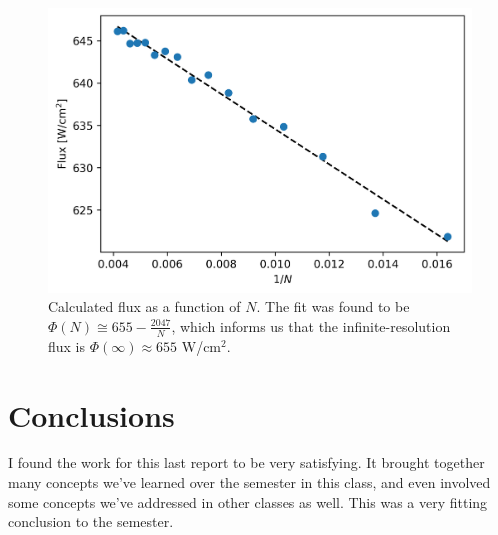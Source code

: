 \documentclass{article}
\begin{document}
\bigskip
{}
\medskip

\begin{figure}[H]
    \centering
    \includegraphics[width=4.5in]{homework10/4.png}
    \caption{Calculated flux as a function of $N$. The fit was found to be $\displaystyle \Phi(N)\cong655-\frac{2047}{N}$, which informs us that the infinite-resolution flux is $\Phi(\infty)\approx655$ W/cm$^2$.}
    \label{fig:4}
\end{figure}

\section{Conclusions}

I found the work for this last report to be very satisfying. It brought together many concepts we've learned over the semester in this class, and even involved some concepts we've addressed in other classes as well. This was a very fitting conclusion to the semester.
\end{document}
